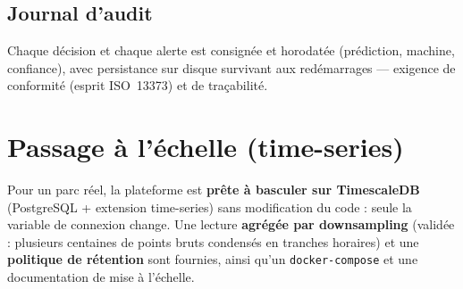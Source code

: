 \subsection{Journal d'audit}
Chaque décision et chaque alerte est consignée et horodatée (prédiction, machine, confiance),
avec persistance sur disque survivant aux redémarrages --- exigence de conformité (esprit
ISO~13373) et de traçabilité.

\section{Passage à l'échelle (time-series)}
Pour un parc réel, la plateforme est \textbf{prête à basculer sur TimescaleDB} (PostgreSQL +
extension time-series) sans modification du code : seule la variable de connexion change.
Une lecture \textbf{agrégée par downsampling} (validée : plusieurs centaines de points bruts
condensés en tranches horaires) et une \textbf{politique de rétention} sont fournies, ainsi
qu'un \texttt{docker-compose} et une documentation de mise à l'échelle.
